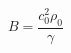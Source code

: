 \documentclass[12pt]{article}
\begin{document}
$$
   B = \frac{c_0^2 \rho_0}{\gamma}
$$
\end{document}
